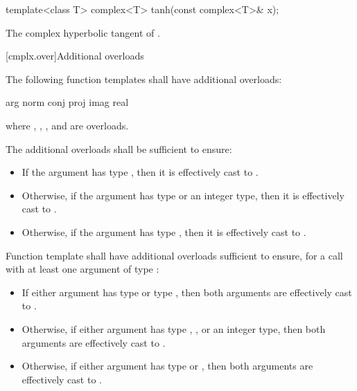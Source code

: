 %
\begin{itemdecl}
template<class T> complex<T> tanh(const complex<T>& x);
\end{itemdecl}

\begin{itemdescr}
\pnum
\returns
The complex hyperbolic tangent of .
\end{itemdescr}

[cmplx.over]{Additional overloads}

\pnum
{}%
%
%
%
%
The following function templates shall have additional overloads:
\begin{codeblock}
arg                   norm
conj                  proj
imag                  real
\end{codeblock}
where , , , and  are  overloads.

\pnum
{}%
The additional overloads shall be sufficient to ensure:

\begin{itemize}
        \item If the argument has type , then it is effectively
              cast to .
        \item Otherwise, if the argument has type  or an integer type,
              then it is effectively cast to .
        \item Otherwise, if the argument has type , then it is
              effectively cast to .
\end{itemize}

\pnum
{}%
Function template  shall have additional overloads sufficient to
ensure, for a call with at least one argument of type :

\begin{itemize}

  \item If either argument has type  or type , then both arguments are effectively cast to
        .
  \item Otherwise, if either argument has type , ,
        or an integer type, then both arguments are effectively cast to
        .
  \item Otherwise, if either argument has type  or ,
        then both arguments are effectively cast to .
\end{itemize}

